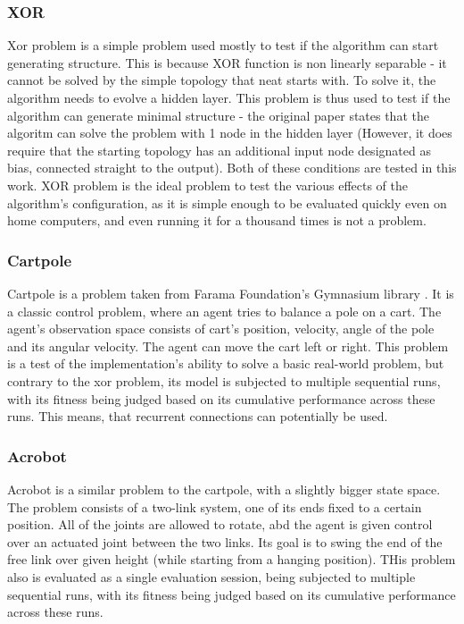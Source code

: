 \documentclass{article}
\begin{document}
        \subsubsection{XOR}
        Xor problem is a simple problem used mostly to test if the algorithm can start generating structure. 
        This is because XOR function is non linearly separable - it cannot be solved by the simple topology that neat starts with.
        To solve it, the algorithm needs to evolve a hidden layer. 
        This problem is thus used to test if the algorithm can generate minimal structure - the original paper \cite{originalNeat}
        states that the algoritm can solve the problem with 1 node in the hidden layer (However,
        it does require that the starting topology has an additional input node designated
        as bias, connected straight to the output). Both of these conditions are tested in this work.
        XOR problem is the ideal problem to test the various effects of the algorithm's configuration, as it is simple enough to be
        evaluated quickly even on home computers, and even running it for a thousand times is not a problem.
        \subsubsection{Cartpole}
        Cartpole is a problem taken from Farama Foundation's Gymnasium library \cite{gymnasium}. It is a classic control problem, 
        where an agent tries to balance a pole on a cart. The agent's observation space consists of cart's 
        position, velocity, angle of the pole and its angular velocity. The agent can move the cart left or right.
        This problem is a test of the implementation's ability to solve a basic real-world problem, but contrary 
        to the xor problem, its model is subjected to multiple sequential runs,
        with its fitness being judged based on its cumulative performance across these runs. This means, that
        recurrent connections can potentially be used.
        \subsubsection{Acrobot}
        Acrobot is a similar problem to the cartpole, with a slightly bigger state space. The problem consists
        of a two-link system, one of its ends fixed to a certain position. All of the joints are allowed to rotate,
        abd the agent is given control over an actuated joint between the two links. Its goal is to swing the
        end of the free link over given height (while starting from a hanging position). 
        THis problem also is evaluated as a single evaluation session, being subjected to multiple sequential runs,
        with its fitness being judged based on its cumulative performance across these runs.
\end{document}
